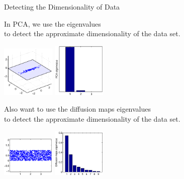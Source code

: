 \documentclass[12pt]{beamer}
\begin{document}
\begin{frame}{Detecting the Dimensionality of Data}

\centering
In PCA, we use the eigenvalues \\to detect the approximate dimensionality of the data set.

\includegraphics[width=1in]{PCA_data}
\includegraphics[width=1in]{PCA_evals}

\vfill

Also want to use the diffusion maps eigenvalues \\to detect the approximate dimensionality of the data set.

\includegraphics[width=1in]{strip_data_nocolor}
\includegraphics[width=1in]{strip_evals_nocolor}


\end{frame}
\end{document}
